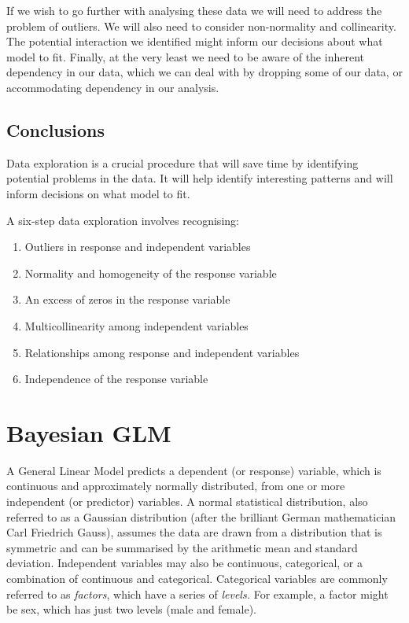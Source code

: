 \documentclass[
]{book}
\providecommand{\tightlist}{%
  \setlength{\itemsep}{0pt}\setlength{\parskip}{0pt}}
\begin{document}
If we wish to go further with analysing these data we will need to address the problem of outliers. We will also need to consider non-normality and collinearity. The potential interaction we identified might inform our decisions about what model to fit. Finally, at the very least we need to be aware of the inherent dependency in our data, which we can deal with by dropping some of our data, or accommodating dependency in our analysis.

\hypertarget{conclusions}{%
\section{Conclusions}\label{conclusions}}

Data exploration is a crucial procedure that will save time by identifying potential problems in the data. It will help identify interesting patterns and will inform decisions on what model to fit.

A six-step data exploration involves recognising:

\begin{enumerate}
\def\labelenumi{\arabic{enumi}.}
\tightlist
\item
  Outliers in response and independent variables
\item
  Normality and homogeneity of the response variable
\item
  An excess of zeros in the response variable
\item
  Multicollinearity among independent variables
\item
  Relationships among response and independent variables
\item
  Independence of the response variable
\end{enumerate}

\hypertarget{gen-model}{%
\chapter{Bayesian GLM}\label{gen-model}}

A General Linear Model predicts a dependent (or response) variable, which is continuous and approximately normally distributed, from one or more independent (or predictor) variables. A normal statistical distribution, also referred to as a Gaussian distribution (after the brilliant German mathematician Carl Friedrich Gauss), assumes the data are drawn from a distribution that is symmetric and can be summarised by the arithmetic mean and standard deviation. Independent variables may also be continuous, categorical, or a combination of continuous and categorical. Categorical variables are commonly referred to as \emph{factors}, which have a series of \emph{levels.} For example, a factor might be sex, which has just two levels (male and female).
\end{document}
